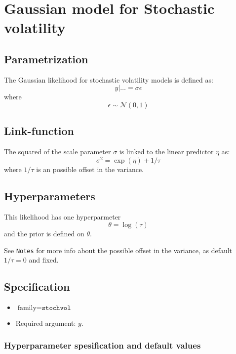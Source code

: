 \documentclass[a4paper,11pt]{article}
\begin{document}
\section*{Gaussian model for Stochastic volatility}

\subsection*{Parametrization}

The Gaussian likelihood for stochastic volatility models is defined
as:
\[
y |\ldots =\sigma \epsilon
\]
where
\[
\epsilon \sim\mathcal{N}(0,1)
\]

\subsection*{Link-function}

The squared of the scale parameter $\sigma$ is linked to the linear predictor
$\eta$ as:
\[
\sigma^{2} =\exp(\eta) + 1/\tau
\]
where $1/\tau$ is an possible offset in the variance.

\subsection*{Hyperparameters}

This likelihood has one hyperparmeter
\begin{displaymath}
    \theta = \log(\tau)
\end{displaymath}
and the prior is defined on $\theta$.

See \texttt{Notes} for more info about the possible offset in the
variance, as default $1/\tau=0$ and fixed.

\subsection*{Specification}

\begin{itemize}
\item $\text{family}=\texttt{stochvol}$
\item Required argument: $y$.
\end{itemize}

\subsubsection*{Hyperparameter spesification and default values}

\end{document}

